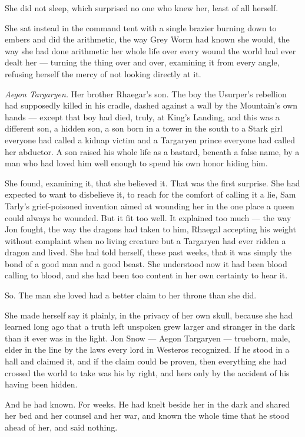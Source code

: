 She did not sleep, which surprised no one who knew her, least of all herself.

She sat instead in the command tent with a single brazier burning down to embers and did the arithmetic, the way Grey Worm had known she would, the way she had done arithmetic her whole life over every wound the world had ever dealt her — turning the thing over and over, examining it from every angle, refusing herself the mercy of not looking directly at it.

\textit{Aegon Targaryen.} Her brother Rhaegar’s son. The boy the Usurper’s rebellion had supposedly killed in his cradle, dashed against a wall by the Mountain’s own hands — except that boy had died, truly, at King’s Landing, and this was a different son, a hidden son, a son born in a tower in the south to a Stark girl everyone had called a kidnap victim and a Targaryen prince everyone had called her abductor. A son raised his whole life as a bastard, beneath a false name, by a man who had loved him well enough to spend his own honor hiding him.

She found, examining it, that she believed it. That was the first surprise. She had expected to want to disbelieve it, to reach for the comfort of calling it a lie, Sam Tarly’s grief-poisoned invention aimed at wounding her in the one place a queen could always be wounded. But it fit too well. It explained too much — the way Jon fought, the way the dragons had taken to him, Rhaegal accepting his weight without complaint when no living creature but a Targaryen had ever ridden a dragon and lived. She had told herself, these past weeks, that it was simply the bond of a good man and a good beast. She understood now it had been blood calling to blood, and she had been too content in her own certainty to hear it.

\sceneBreak

So. The man she loved had a better claim to her throne than she did.

She made herself say it plainly, in the privacy of her own skull, because she had learned long ago that a truth left unspoken grew larger and stranger in the dark than it ever was in the light. Jon Snow — Aegon Targaryen — trueborn, male, elder in the line by the laws every lord in Westeros recognized. If he stood in a hall and claimed it, and if the claim could be proven, then everything she had crossed the world to take was his by right, and hers only by the accident of his having been hidden.

And he had known. For weeks. He had knelt beside her in the dark and shared her bed and her counsel and her war, and known the whole time that he stood ahead of her, and said nothing.

